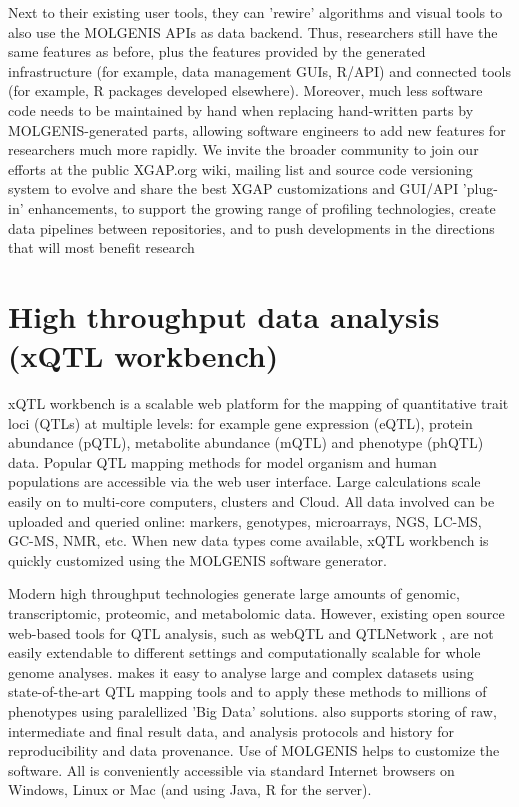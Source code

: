 Next to their existing user tools, they can 'rewire' algorithms and visual tools to also use 
the MOLGENIS APIs as data backend. Thus, researchers still have the same features as before, 
plus the features provided by the generated infrastructure (for example, data management GUIs, 
R/API) and connected tools (for example, R packages developed elsewhere). Moreover, much 
less software code needs to be maintained by hand when replacing hand-written parts by 
MOLGENIS-generated parts,  allowing software engineers to add new features for researchers 
much more rapidly. We invite the broader community to join our efforts at the public XGAP.org 
wiki, mailing list and source code versioning system to evolve and share the best XGAP 
customizations and GUI/API 'plug-in' enhancements, to support the growing range of profiling 
technologies, create data pipelines between repositories, and to push developments in the 
directions that will most benefit research

\section{High throughput data analysis (xQTL workbench)}
xQTL workbench is a scalable web platform for the mapping of quantitative trait loci (QTLs) 
at multiple levels: for example gene expression (eQTL), protein abundance (pQTL), metabolite 
abundance (mQTL) and phenotype (phQTL) data. Popular QTL mapping methods for model organism 
and human populations are accessible via the web user interface. Large calculations scale 
easily on to multi-core computers, clusters and Cloud. All data involved can be uploaded 
and queried online: markers, genotypes, microarrays, NGS, LC-MS, GC-MS, NMR, etc. When new 
data types come available, xQTL workbench is quickly customized using the MOLGENIS software 
generator.

Modern high throughput technologies generate large amounts of genomic, transcriptomic, proteomic, 
and metabolomic data. However, existing open source web-based tools for QTL analysis, such as 
webQTL \cite{Wang:2003} and QTLNetwork \cite{Yang:2008}, are not easily extendable to different 
settings and computationally scalable for whole genome analyses. \xqtlwb makes it easy to analyse 
large and complex datasets using state-of-the-art QTL mapping tools and to apply these methods 
to millions of phenotypes using paralellized 'Big Data' solutions\cite{Trelles:2011}. 
\xqtlwb also supports storing of raw, intermediate and final result data, and analysis protocols 
and history for reproducibility and data provenance. Use of MOLGENIS\cite{Swertz:2010b} 
helps to customize the software. All is conveniently accessible via standard Internet browsers on 
Windows, Linux or Mac (and using Java, R for the server).


